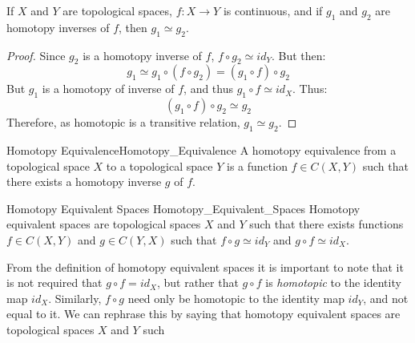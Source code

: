 \documentclass[crop=false,class=book,oneside]{standalone}                      %
\begin{document}
            \begin{theorem}
                If $X$ and $Y$ are topological spaces, $f:X\rightarrow{Y}$ is
                continuous, and if $g_{1}$ and $g_{2}$ are homotopy inverses
                of $f$, then $g_{1}\simeq{g}_{2}$.
            \end{theorem}
            \begin{proof}
                Since $g_{2}$ is a homotopy inverse of $f$,
                $f\circ{g}_{2}\simeq{id}_{Y}$. But then:
                \begin{equation}
                    g_{1}\simeq{g}_{1}\circ(f\circ{g}_{2})
                    =(g_{1}\circ{f})\circ{g}_{2}
                \end{equation}
                But $g_{1}$ is a homotopy of inverse of $f$,
                and thus $g_{1}\circ{f}\simeq{id}_{X}$. Thus:
                \begin{equation}
                    (g_{1}\circ{f})\circ{g}_{2}\simeq{g}_{2}
                \end{equation}
                Therefore, as homotopic is a transitive relation,
                $g_{1}\simeq{g}_{2}$.
            \end{proof}
            \begin{ldefinition}{Homotopy Equivalence}{Homotopy_Equivalence}
                A homotopy equivalence from a topological space $X$ to a
                topological space $Y$ is a function $f\in{C}(X,Y)$ such that
                there exists a homotopy inverse $g$ of $f$.
            \end{ldefinition}
            \begin{ldefinition}{Homotopy Equivalent Spaces}
                               {Homotopy_Equivalent_Spaces}
                Homotopy equivalent spaces are topological spaces $X$ and $Y$
                such that there exists functions ${f}\in{C(X,Y)}$ and
                ${g}\in{C(Y,X)}$ such that ${f}\circ{g}\simeq{id_{Y}}$
                and ${g}\circ{f}\simeq{id_{X}}$.
            \end{ldefinition}
            From the definition of homotopy equivalent spaces it is important
            to note that it is not required that $g\circ{f}=id_{X}$, but rather
            that $g\circ{f}$ is \textit{homotopic} to the identity map $id_{X}$.
            Similarly, $f\circ{g}$ need only be homotopic to the identity map
            $id_{Y}$, and not equal to it. We can rephrase this by saying that
            homotopy equivalent spaces are topological spaces $X$ and $Y$ such
\end{document}
